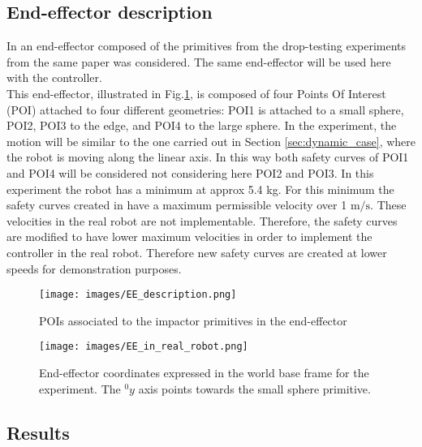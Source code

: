 \subsection{End-effector description}
In \cite{sammi_paper} an end-effector composed of the primitives from the drop-testing experiments from the same paper was considered. The same end-effector will be used here with the controller.\\
%
This end-effector, illustrated in  Fig.\ref{fig:EE_description}, is composed of four Points Of Interest (POI) attached to four different geometries: POI1 is attached to a small sphere, POI2, POI3 to the edge, and POI4 to the large sphere. 
In the experiment, the motion will be similar to the one carried out in Section \ref{sec:dynamic_case}, where the robot is moving along the linear axis. In this way both safety curves of POI1 and POI4 will be considered not considering here POI2 and POI3.
In this experiment the robot has a minimum at approx 5.4 kg. For this minimum the safety curves created in  \cite{sammi_paper} have a maximum permissible velocity over 1 $\mathrm{m/s}$. These velocities in the real robot are not implementable. Therefore, the safety curves are modified to have lower maximum velocities in order to implement the controller in the real robot. Therefore new safety curves are created at lower speeds for demonstration purposes.





\begin{figure}[t!]
	\centerline{
		\texttt{[image: images/EE\_description.png]}}
	\caption{POIs associated to the impactor primitives in the end-effector \cite{sammi_paper}}
	\label{fig:EE_description}
\end{figure}



\begin{figure}[t!]
	\centerline{
		\texttt{[image: images/EE\_in\_real\_robot.png]}}
	\caption{End-effector coordinates expressed in the world base frame for the experiment. The ${}^{0}_{}y$ axis points towards the small sphere primitive. \cite{sammi_paper}}
	\label{fig:EE_in_real_robot}
\end{figure}





\subsection{Results}

